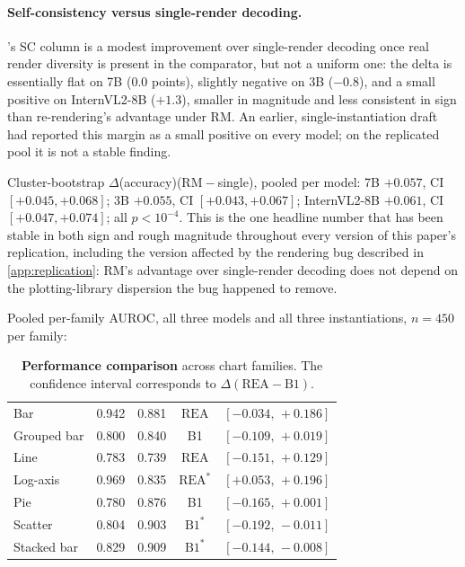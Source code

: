 \documentclass[11pt]{article}
\newcommand{\rea}{\mathrm{REA}}
\newcommand{\rmg}{\mathrm{RM}}
\begin{document}
\paragraph{Self-consistency versus single-render decoding.} 's SC column is a modest improvement over single-render decoding once real render diversity is present in the comparator, but not a uniform one: the delta is essentially flat on 7B ($0.0$ points), slightly negative on 3B ($-0.8$), and a small positive on InternVL2-8B ($+1.3$), smaller in magnitude and less consistent in sign than re-rendering's advantage under $\rmg$. An earlier, single-instantiation draft had reported this margin as a small positive on every model; on the replicated pool it is not a stable finding.

\noindent Cluster-bootstrap $\Delta$(accuracy)($\rmg-$single), pooled per model: 7B $+0.057$, CI $[+0.045,+0.068]$; 3B $+0.055$, CI $[+0.043,+0.067]$; InternVL2-8B $+0.061$, CI $[+0.047,+0.074]$; all $p<10^{-4}$. This is the one headline number that has been stable in both sign and rough magnitude throughout every version of this paper's replication, including the version affected by the rendering bug described in \cref{app:replication}: $\rmg$'s advantage over single-render decoding does not depend on the plotting-library dispersion the bug happened to remove.

\medskip
\noindent Pooled per-family AUROC, all three models and all three instantiations, $n{=}450$ per family:


\begin{table}[t]
\centering
\caption{\textbf{Performance comparison} across chart families. The confidence interval corresponds to $\Delta(\rea-\mathrm{B1})$.}
\label{tab:family_comparison}
\small
\setlength{\tabcolsep}{3.2pt}
\renewcommand{\arraystretch}{1.08}
\begin{tabular}{
@{}l
S[table-format=1.3]
S[table-format=1.3]
c
c@{}
}
\toprule
{} &
{\kilth{$\rea$}} &
{} &
{} &
{} \\
\midrule
Bar         & 0.942 & 0.881 & $\rea$               & $[-0.034,\,+0.186]$ \\
Grouped bar & 0.800 & 0.840 & B1                   & $[-0.109,\,+0.019]$ \\
Line        & 0.783 & 0.739 & $\rea$               & $[-0.151,\,+0.129]$ \\
Log-axis    & 0.969 & 0.835 & $\rea^{\ast}$        & $[+0.053,\,+0.196]$ \\
Pie         & 0.780 & 0.876 & B1                   & $[-0.165,\,+0.001]$ \\
Scatter     & 0.804 & 0.903 & $\mathrm{B1}^{\ast}$ & $[-0.192,\,-0.011]$ \\
Stacked bar & 0.829 & 0.909 & $\mathrm{B1}^{\ast}$ & $[-0.144,\,-0.008]$ \\
\bottomrule
\end{tabular}
\end{table}
\end{document}
